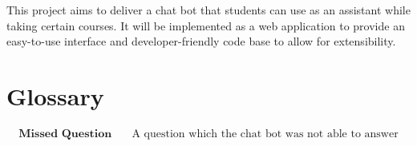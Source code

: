 \documentclass{article}
\begin{document}
This project aims to deliver a chat bot that students can use as an assistant while taking certain courses. It will be implemented as a web application to provide an easy-to-use interface and developer-friendly code base to allow for extensibility. 

\section{Glossary} %

\begin{align*}
  \textbf{Missed Question}    \quad   &\text{A question which the chat bot was not able to answer}
\end{align*}
\end{document}
